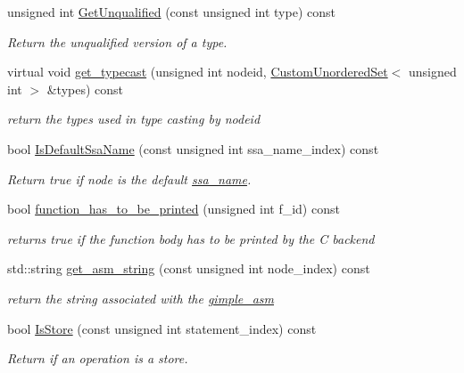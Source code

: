 \begin{DoxyCompactItemize}
unsigned int \hyperlink{classBehavioralHelper_abf4e55bf4abfce3b7a49a58803e73f66}{Get\+Unqualified} (const unsigned int type) const
\begin{DoxyCompactList}\small\item\em Return the unqualified version of a type. \end{DoxyCompactList}\item 
virtual void \hyperlink{classBehavioralHelper_ad7b32825859d731ce27077af3c130ea0}{get\+\_\+typecast} (unsigned int nodeid, \hyperlink{classCustomUnorderedSet}{Custom\+Unordered\+Set}$<$ unsigned int $>$ \&types) const
\begin{DoxyCompactList}\small\item\em return the types used in type casting by nodeid \end{DoxyCompactList}\item 
bool \hyperlink{classBehavioralHelper_ab3cf7f144e14b8297d4f596ff8f54f90}{Is\+Default\+Ssa\+Name} (const unsigned int ssa\+\_\+name\+\_\+index) const
\begin{DoxyCompactList}\small\item\em Return true if node is the default \hyperlink{structssa__name}{ssa\+\_\+name}. \end{DoxyCompactList}\item 
bool \hyperlink{classBehavioralHelper_a06c2b533436efe15b08253dea9eb5222}{function\+\_\+has\+\_\+to\+\_\+be\+\_\+printed} (unsigned int f\+\_\+id) const
\begin{DoxyCompactList}\small\item\em returns true if the function body has to be printed by the C backend \end{DoxyCompactList}\item 
std\+::string \hyperlink{classBehavioralHelper_a29fb375c54f0dc9caa3559aff0ff1850}{get\+\_\+asm\+\_\+string} (const unsigned int node\+\_\+index) const
\begin{DoxyCompactList}\small\item\em return the string associated with the \hyperlink{structgimple__asm}{gimple\+\_\+asm} \end{DoxyCompactList}\item 
bool \hyperlink{classBehavioralHelper_ad7192a9a6392ac06d5d2cc429267445a}{Is\+Store} (const unsigned int statement\+\_\+index) const
\begin{DoxyCompactList}\small\item\em Return if an operation is a store. \end{DoxyCompactList}\item 

\end{DoxyCompactItemize}
